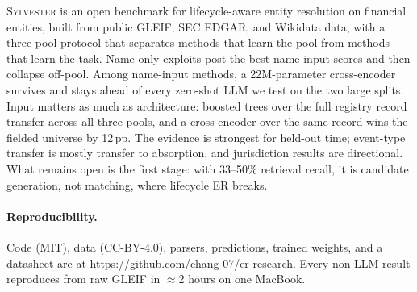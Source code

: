 \documentclass[sigconf]{acmart}
\begin{document}
\textsc{Sylvester} is an open benchmark for lifecycle-aware entity
resolution on financial entities, built from public GLEIF, SEC
EDGAR, and Wikidata data, with a three-pool protocol that separates
methods that learn the pool from methods that learn the task.
Name-only exploits post the best name-input scores and then
collapse off-pool. Among name-input methods, a 22M-parameter
cross-encoder survives and stays ahead of every zero-shot LLM we
test on the two large splits. Input matters as much as
architecture: boosted trees over the full registry record transfer
across all three pools, and a cross-encoder over the same record
wins the fielded universe by 12\,pp. The evidence is strongest for
held-out time; event-type transfer is mostly transfer to
absorption, and jurisdiction results are directional. What remains
open is the first stage: with 33--50\% retrieval recall, it is
candidate generation, not matching, where lifecycle ER breaks.

\paragraph{Reproducibility.} Code (MIT), data (CC-BY-4.0),
parsers, predictions, trained weights, and a datasheet are at
\url{https://github.com/chang-07/er-research}. Every non-LLM result
reproduces from raw GLEIF in $\approx$2 hours on one MacBook.



\end{document}
